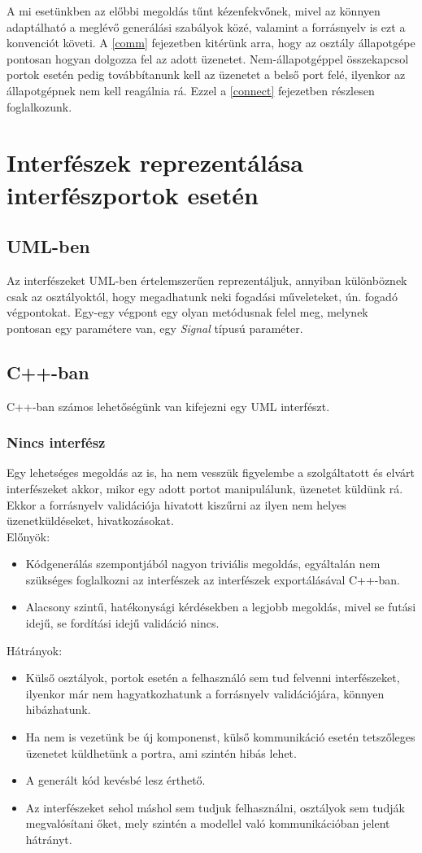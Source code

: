 \documentclass[a4paper,12pt]{report}
\begin{document}
A mi esetünkben az előbbi megoldás tűnt kézenfekvőnek, mivel az könnyen adaptálható a meglévő generálási szabályok közé, valamint a forrásnyelv is ezt a konvenciót követi. A \ref{comm} fejezetben kitérünk arra, hogy az osztály állapotgépe pontosan hogyan dolgozza fel az adott üzenetet. Nem-állapotgéppel összekapcsol portok esetén pedig továbbítanunk kell az üzenetet a belső port felé, ilyenkor az állapotgépnek nem kell reagálnia rá. Ezzel a \ref{connect} fejezetben részlesen foglalkozunk.

\section{Interfészek reprezentálása interfészportok esetén} \label{inf}
\subsection{UML-ben}
Az interfészeket UML-ben értelemszerűen reprezentáljuk, annyiban különböznek csak az osztályoktól, hogy megadhatunk neki fogadási műveleteket, ún. fogadó végpontokat. Egy-egy végpont egy olyan metódusnak felel meg, melynek pontosan egy paramétere van, egy \textit{Signal} típusú paraméter. 

\subsection{C++-ban}
C++-ban számos lehetőségünk van kifejezni egy UML interfészt.
\subsubsection{Nincs interfész}
Egy lehetséges megoldás az is, ha nem vesszük figyelembe a szolgáltatott és elvárt interfészeket akkor, mikor egy adott portot manipulálunk, üzenetet küldünk rá. Ekkor a forrásnyelv validációja hivatott kiszűrni az ilyen nem helyes üzenetküldéseket, hivatkozásokat. \\
Előnyök:
\begin{itemize}
\item Kódgenerálás szempontjából nagyon triviális megoldás, egyáltalán nem szükséges foglalkozni az interfészek az interfészek exportálásával C++-ban.
\item Alacsony szintű, hatékonysági kérdésekben a legjobb megoldás, mivel se futási idejű, se fordítási idejű validáció nincs. 
\end{itemize}
Hátrányok:
\begin{itemize}
\item Külső osztályok, portok esetén a felhasználó sem tud felvenni interfészeket, ilyenkor már nem hagyatkozhatunk a forrásnyelv validációjára, könnyen hibázhatunk.
\item Ha nem is vezetünk be új komponenst, külső kommunikáció esetén tetszőleges üzenetet küldhetünk a portra, ami szintén hibás lehet.
\item A generált kód kevésbé lesz érthető.
\item Az interfészeket sehol máshol sem tudjuk felhasználni, osztályok sem tudják megvalósítani őket, mely szintén a modellel való kommunikációban jelent hátrányt. 
\end{itemize}
\end{document}
